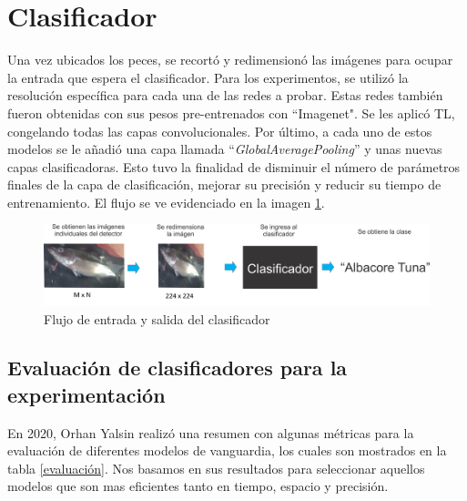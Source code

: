 \section{Clasificador}
Una vez ubicados los peces, se recortó y redimensionó las imágenes 
para ocupar la entrada que espera el clasificador. Para los experimentos, se 
utilizó la resolución específica para cada una de las redes a probar. Estas 
redes también fueron obtenidas con sus pesos pre-entrenados con 
``Imagenet". Se les aplicó TL, congelando todas las capas convolucionales. Por 
último, a cada uno de estos modelos se le añadió una capa llamada 
``\textit{GlobalAveragePooling}'' y unas nuevas capas clasificadoras. Esto tuvo 
la finalidad de disminuir el número de parámetros 
finales de la capa de clasificación, mejorar su precisión y reducir su tiempo 
de entrenamiento. El flujo se ve evidenciado en la imagen \ref{fig:clasificador_pez}.

\begin{figure}[h!]
\includegraphics[width=1\textwidth]{images/clasificador_label.png}
\caption{Flujo de entrada y salida del clasificador }
\label{fig:clasificador_pez}
\end{figure}


\subsection{Evaluación de clasificadores para la experimentación}
En 2020, Orhan Yalsin \cite{DataModelos} realizó una resumen con algunas métricas para la 
evaluación de diferentes modelos de vanguardia, los cuales son mostrados 
en la tabla \ref{evaluación}. Nos basamos en sus resultados para seleccionar 
aquellos modelos que son mas eficientes tanto en tiempo, espacio y precisión.

